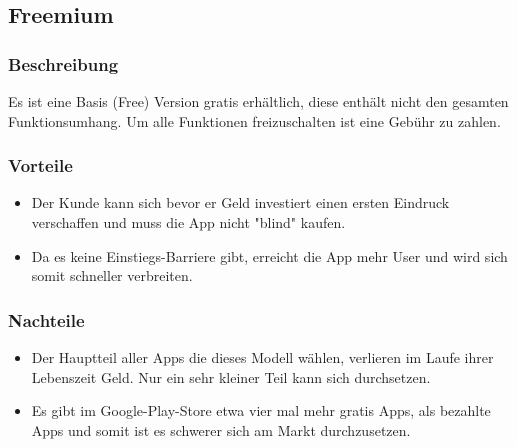 \documentclass[FIPLY_base.tex]{subfiles}
\author{Gerald Irsiegler}
\date{25. Februar 2016}
\begin{document}
\subsection{Freemium}


\subsubsection{Beschreibung}
Es ist eine Basis (Free) Version gratis erhältlich, diese enthält nicht den gesamten Funktionsumhang.
Um alle Funktionen freizuschalten ist eine Gebühr zu zahlen.

\subsubsection{Vorteile}
\begin{itemize}
\item Der Kunde kann sich bevor er Geld investiert einen ersten Eindruck verschaffen und muss die App nicht "blind" kaufen.
\item Da es keine Einstiegs-Barriere gibt, erreicht die App mehr User und wird sich somit schneller verbreiten.
\end{itemize}

\subsubsection{Nachteile}
\begin{itemize}
\item Der Hauptteil aller Apps die dieses Modell wählen, verlieren im Laufe ihrer Lebenszeit Geld. Nur ein sehr kleiner Teil kann sich durchsetzen.
\item Es gibt im Google-Play-Store etwa vier mal mehr gratis Apps, als bezahlte Apps und somit ist es schwerer sich am Markt durchzusetzen.
\end{itemize}
\end{document}
